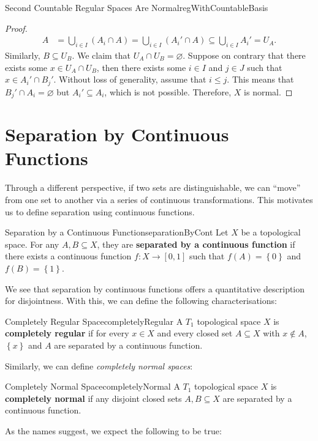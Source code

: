\documentclass[math]{amznotes}
\theoremstyle{remark}
\begin{document}
\begin{probox}{Second Countable Regular Spaces Are Normal}{regWithCountableBasis}
\begin{proof}
        \begin{align*}
            A & = \bigcup_{i \in I}\left(A_i \cap A\right) = \bigcup_{i \in I}\left(A_i' \cap A\right) \subseteq \bigcup_{i \in I}A_i' = U_A.
        \end{align*}
        Similarly, $B \subseteq U_B$. We claim that $U_A \cap U_B = \varnothing$. Suppose on contrary that there exists some $x \in U_A \cap U_B$, then there exists some $i \in I$ and $j \in J$ such that $x \in A_i' \cap B_j'$. Without loss of generality, assume that $i \leq j$. This means that $B_j' \cap A_i = \varnothing$ but $A_i' \subseteq A_i$, which is not possible. Therefore, $X$ is normal.
    \end{proof}
\end{probox}
\section{Separation by Continuous Functions}
Through a different perspective, if two sets are distinguishable, we can ``move'' from one set to another via a series of continuous transformations. This motivates us to define separation using continuous functions.
\begin{dfnbox}{Separation by a Continuous Function}{separationByCont}
    Let $X$ be a topological space. For any $A, B \subseteq X$, they are {\color{red} \textbf{separated by a continuous function}} if there exists a continuous function $f \colon X \to \left[0, 1\right]$ such that $f\left(A\right) = \left\{0\right\}$ and $f\left(B\right) = \left\{1\right\}$.
\end{dfnbox}
We see that separation by continuous functions offers a quantitative description for disjointness. With this, we can define the following characterisations:
\begin{dfnbox}{Completely Regular Space}{completelyRegular}
    A $T_1$ topological space $X$ is {\color{red} \textbf{completely regular}} if for every $x \in X$ and every closed set $A \subseteq X$ with $x \notin A$, $\left\{x\right\}$ and $A$ are separated by a continuous function.
\end{dfnbox}
Similarly, we can define \textit{completely normal spaces}:
\begin{dfnbox}{Completely Normal Space}{completelyNormal}
    A $T_1$ topological space $X$ is {\color{red} \textbf{completely normal}} if any disjoint closed sets $A, B \subseteq X$ are separated by a continuous function.
\end{dfnbox}
As the names suggest, we expect the following to be true:
\end{document}
